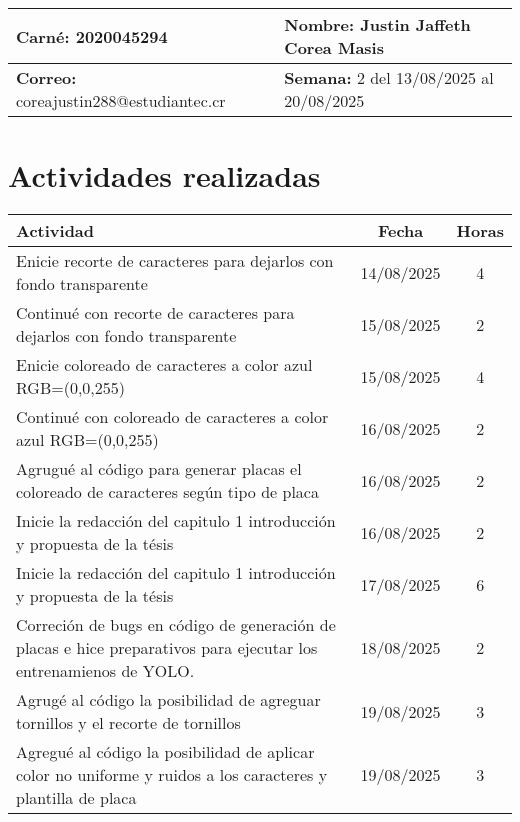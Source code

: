 \documentclass[12pt,a4paper]{article}
\begin{document}
\noindent
\begin{tabularx}{\textwidth}{|X|X|}
\hline
\textbf{Carné:} 2020045294 & \textbf{Nombre:} Justin Jaffeth Corea Masis \\
\hline
\textbf{Correo:} coreajustin288@estudiantec.cr & \textbf{Semana:} 2 del 13/08/2025 al 20/08/2025 \\
\hline
\end{tabularx}

\vspace{0.5cm}

\section*{Actividades realizadas}

\begin{tabularx}{\textwidth}{|>{\raggedright\arraybackslash}p{12cm}|c|c|}
\hline
\textbf{Actividad} & \textbf{Fecha} & \textbf{Horas} \\
\hline
Enicie recorte de caracteres para dejarlos con fondo transparente & 14/08/2025 & 4 \\
\hline
Continué con recorte de caracteres para dejarlos con fondo transparente& 15/08/2025 & 2 \\
\hline
Enicie coloreado de caracteres a color azul RGB=(0,0,255) & 15/08/2025 & 4 \\
\hline
Continué con coloreado de caracteres a color azul RGB=(0,0,255) & 16/08/2025 & 2 \\
\hline
Agrugué al código para generar placas el coloreado de caracteres según tipo de placa & 16/08/2025 & 2 \\
\hline
Inicie la redacción del capitulo 1 introducción y propuesta de la tésis & 16/08/2025 & 2 \\
\hline
Inicie la redacción del capitulo 1 introducción y propuesta de la tésis & 17/08/2025 & 6 \\
\hline
Correción de bugs en código de generación de placas e hice preparativos para ejecutar los entrenamienos
	de YOLO. & 18/08/2025 & 2 \\
\hline
Agrugé al código la posibilidad de agreguar tornillos y el recorte de tornillos & 19/08/2025 & 3 \\
\hline 
Agregué al código la posibilidad de aplicar color no uniforme y ruidos a los caracteres y plantilla de placa & 19/08/2025 & 3 \\
\hline 
\end{tabularx}
\end{document}
